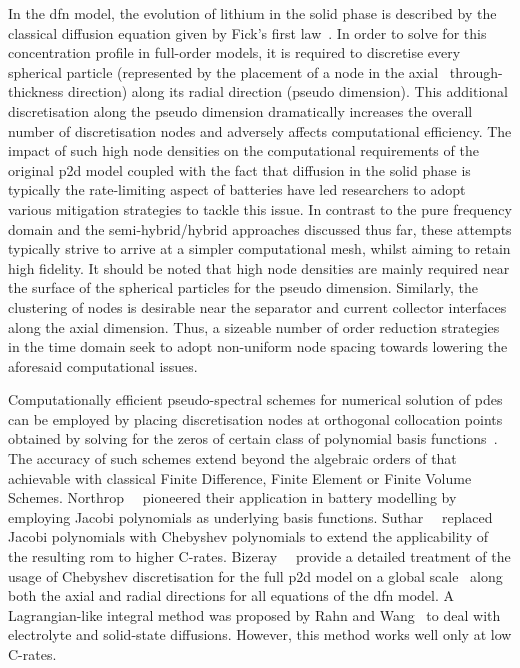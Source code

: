 In the \gls{dfn} model, the evolution of lithium in the solid phase is described
by the classical  diffusion equation given by  Fick's first law~\cite{Fick1995}.
In order  to solve for  this concentration profile  in full-order models,  it is
required to discretise every spherical particle (represented by the placement of
a  node  in  the  axial  \ie~through-thickness  direction)  along  its  radial
direction (pseudo  dimension). This  additional discretisation along  the pseudo
dimension dramatically increases the overall  number of discretisation nodes and
adversely  affects  computational  efficiency.  The impact  of  such  high  node
densities  on the  computational requirements  of the  original \gls{p2d}  model
coupled  with the  fact  that diffusion  in  the solid  phase  is typically  the
rate-limiting  aspect  of  batteries  have  led  researchers  to  adopt  various
mitigation strategies  to tackle this issue.  In contrast to the  pure frequency
domain and the semi-hybrid/hybrid approaches  discussed thus far, these attempts
typically strive  to arrive at  a simpler  computational mesh, whilst  aiming to
retain high  fidelity. It should  be noted that  high node densities  are mainly
required near the  surface of the spherical particles for  the pseudo dimension.
Similarly, the clustering  of nodes is desirable near the  separator and current
collector interfaces along the axial dimension.
Thus, a sizeable number  of order reduction strategies in the time  domain seek
to adopt non-uniform node  spacing towards lowering the aforesaid computational
issues.

Computationally    efficient     pseudo-spectral    schemes     for    numerical
solution   of   \glspl{pde}   can   be  employed   by   placing   discretisation
nodes    at    orthogonal    collocation     points    obtained    by    solving
for     the     zeros    of     certain     class     of    polynomial     basis
functions~\cite{Ferguson1971,Trefethen2000,Boyd2001,Shizgal2015,Dutykh2016}. The
accuracy of such  schemes extend beyond the algebraic orders  of that achievable
with  classical Finite  Difference,  Finite Element  or  Finite Volume  Schemes.
Northrop~\etal{}~\cite{Northrop2011}  pioneered  their  application  in  battery
modelling  by  employing  Jacobi  polynomials  as  underlying  basis  functions.
Suthar~\etal{}~\cite{Suthar2014}  replaced  Jacobi  polynomials  with  Chebyshev
polynomials to  extend the  applicability of the  resulting \gls{rom}  to higher
C-rates. Bizeray~\etal{}~\cite{Bizeray2015} provide a  detailed treatment of the
usage  of Chebyshev  discretisation for  the full  \gls{p2d} model  on a  global
scale \ie~along both the axial and radial directions for all equations of the
\gls{dfn}  model. A  Lagrangian-like integral  method was  proposed by  Rahn and
Wang~\cite{Rahn2013}  to  deal  with  electrolyte  and  solid-state  diffusions.
However, this method works well only at low C-rates.


